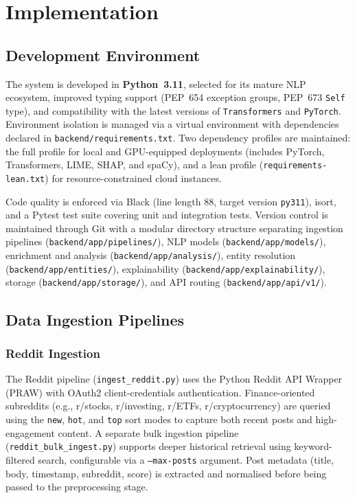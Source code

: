 \chapter{Implementation}
\label{chap:implementation}

\section{Development Environment}
\label{sec:dev_env}

The system is developed in \textbf{Python~3.11}, selected for its mature NLP ecosystem, improved typing support (PEP~654 exception groups, PEP~673 \texttt{Self} type), and compatibility with the latest versions of \texttt{Transformers} and \texttt{PyTorch}.  Environment isolation is managed via a virtual environment with dependencies declared in \texttt{backend/requirements.txt}.  Two dependency profiles are maintained: the full profile for local and GPU-equipped deployments (includes PyTorch, Transformers, LIME, SHAP, and spaCy), and a lean profile (\texttt{requirements-lean.txt}) for resource-constrained cloud instances.

Code quality is enforced via Black (line length 88, target version \texttt{py311}), isort, and a Pytest test suite covering unit and integration tests.  Version control is maintained through Git with a modular directory structure separating ingestion pipelines (\texttt{backend/app/pipelines/}), NLP models (\texttt{backend/app/models/}), enrichment and analysis (\texttt{backend/app/analysis/}), entity resolution (\texttt{backend/app/entities/}), explainability (\texttt{backend/app/explainability/}), storage (\texttt{backend/app/storage/}), and API routing (\texttt{backend/app/api/v1/}).

\section{Data Ingestion Pipelines}
\label{sec:data_ingestion}

\subsection{Reddit Ingestion}

The Reddit pipeline (\texttt{ingest\_reddit.py}) uses the Python Reddit API Wrapper (PRAW) with OAuth2 client-credentials authentication.  Finance-oriented subreddits (e.g., r/stocks, r/investing, r/ETFs, r/cryptocurrency) are queried using the \texttt{new}, \texttt{hot}, and \texttt{top} sort modes to capture both recent posts and high-engagement content.  A separate bulk ingestion pipeline (\texttt{reddit\_bulk\_ingest.py}) supports deeper historical retrieval using keyword-filtered search, configurable via a \texttt{--max-posts} argument.  Post metadata (title, body, timestamp, subreddit, score) is extracted and normalised before being passed to the preprocessing stage.

